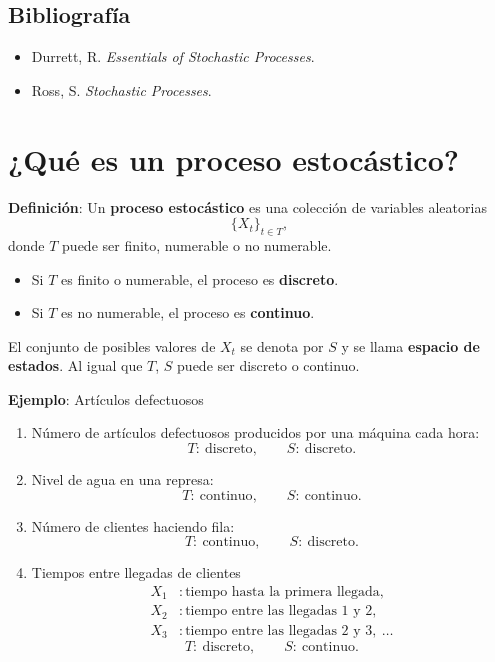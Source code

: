 \documentclass[12pt,a4paper]{article}
\newcommand{\definicion}[1]{%
\begin{definicionbox}
\textbf{Definición}: #1
\end{definicionbox}
}
\begin{document}
\subsection*{Bibliografía}
\begin{itemize}
    \item Durrett, R. \textit{Essentials of Stochastic Processes}.
    \item Ross, S. \textit{Stochastic Processes}.
\end{itemize}

\section{¿Qué es un proceso estocástico?}
\definicion{Un \textbf{proceso estocástico} es una colección de variables aleatorias
\begin{equation*}
\{X_t\}_{t\in T},
\end{equation*}
donde $T$ puede ser finito, numerable o no numerable.
\begin{itemize}
    \item Si $T$ es finito o numerable, el proceso es \textbf{discreto}.
    \item Si $T$ es no numerable, el proceso es \textbf{continuo}.
\end{itemize}
El conjunto de posibles valores de $X_t$ se denota por $S$ y se llama \textbf{espacio de estados}. Al igual que $T$, $S$ puede ser discreto o continuo.}

\textbf{Ejemplo}: Artículos defectuosos
\begin{enumerate}
    \item Número de artículos defectuosos producidos por una máquina cada hora:
    \begin{equation*}
    T:\ \text{discreto}, \qquad S:\ \text{discreto}.
    \end{equation*}
    \item Nivel de agua en una represa:
    \begin{equation*}
    T:\ \text{continuo}, \qquad S:\ \text{continuo}.
    \end{equation*}
    \item Número de clientes haciendo fila:
    \begin{equation*}
    T:\ \text{continuo}, \qquad S:\ \text{discreto}.
    \end{equation*}
    \item Tiempos entre llegadas de clientes
    \begin{align*}
        X_1 &: \text{tiempo hasta la primera llegada},\\
        X_2 &: \text{tiempo entre las llegadas 1 y 2},\\
        X_3 &: \text{tiempo entre las llegadas 2 y 3},\ \ldots
    \end{align*}
    \begin{equation*}
    T:\ \text{discreto}, \qquad S:\ \text{continuo}.
    \end{equation*}
\end{enumerate}
\end{document}
